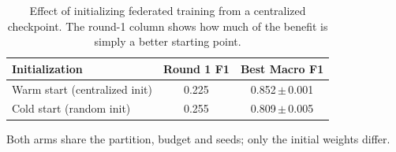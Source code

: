\begin{table}[t]
\caption{Effect of initializing federated training from a centralized checkpoint. The round-1 column shows how much of the benefit is simply a better starting point.}
\label{tab:warmstart}
\centering\footnotesize
\setlength\tabcolsep{5pt}
\begin{tabular}{lcc}
\toprule
\textbf{Initialization} & Round 1 F1 & \textbf{Best Macro F1}\\
\midrule
Warm start (centralized init) & 0.225 & 0.852\,$\pm$\,0.001 \\
Cold start (random init) & 0.255 & 0.809\,$\pm$\,0.005 \\
\bottomrule
\end{tabular}
\vspace{1pt}

{\scriptsize Both arms share the partition, budget and seeds; only the initial weights differ.}
\end{table}
